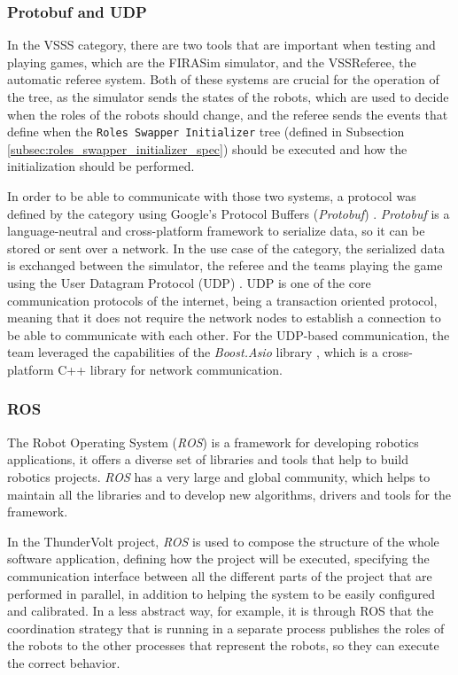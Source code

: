 \subsubsection{Protobuf and UDP}

In the VSSS category, there are two tools that are important when testing and playing games, which are the FIRASim simulator, and the VSSReferee, the automatic referee system. Both of these systems are crucial for the operation of the tree, as the simulator sends the states of the robots, which are used to decide when the roles of the robots should change, and the referee sends the events that define when the \texttt{Roles Swapper Initializer} tree (defined in Subsection \ref{subsec:roles_swapper_initializer_spec}) should be executed and how the initialization should be performed.

In order to be able to communicate with those two systems, a protocol was defined by the category \cite{VSSProto} using Google's Protocol Buffers (\textit{Protobuf}) \cite{Protobuf}. \textit{Protobuf} is a language-neutral and cross-platform framework to serialize data, so it can be stored or sent over a network. In the use case of the category, the serialized data is exchanged between the simulator, the referee and the teams playing the game using the User Datagram Protocol (UDP) \cite{rfc768}. UDP is one of the core communication protocols of the internet, being a transaction oriented protocol, meaning that it does not require the network nodes to establish a connection to be able to communicate with each other. For the UDP-based communication, the team leveraged the capabilities of the \textit{Boost.Asio} library \cite{BoostAsio}, which is a cross-platform C++ library for network communication.

\subsubsection{ROS}

The Robot Operating System (\textit{ROS}) \cite{ROS} is a framework for developing robotics applications, it offers a diverse set of libraries and tools that help to build robotics projects. \textit{ROS} has a very large and global community, which helps to maintain all the libraries and to develop new algorithms, drivers and tools for the framework.

In the ThunderVolt project, \textit{ROS} is used to compose the structure of the whole software application, defining how the project will be executed, specifying the communication interface between all the different parts of the project that are performed in parallel, in addition to helping the system to be easily configured and calibrated. In a less abstract way, for example, it is through ROS that the coordination strategy that is running in a separate process publishes the roles of the robots to the other processes that represent the robots, so they can execute the correct behavior.
